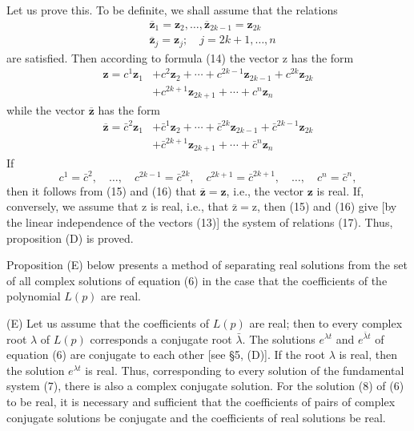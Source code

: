 \documentclass[10pt,a5paper]{book}
\theoremstyle{plain}
\theoremstyle{definition}
\theoremstyle{remark}
\begin{document}
Let us prove this. To be definite, we shall assume that the relations
\[
\begin{aligned}
& \overline{\mathbf{z}}_{1}=\mathbf{z}_{2}, \ldots, \overline{\mathbf{z}}_{2 k-1}=\mathbf{z}_{2 k} \\
& \overline{\mathbf{z}}_{j}=\mathbf{z}_{j} ; \quad j=2 k+1, \ldots, n
\end{aligned}
\]
are satisfied. Then according to formula (14) the vector z has the form
\begin{align*}
\mathbf{z}=c^{1} \mathbf{z}_{1} & +c^{2} \mathbf{z}_{2}+\cdots+c^{2 k-1} \mathbf{z}_{2 k-1}+c^{2 k} \mathbf{z}_{2 k} \\
& +c^{2 k+1} \mathbf{z}_{2 k+1}+\cdots+c^{n} \mathbf{z}_{n} \tag{15}
\end{align*}
while the vector $\overline{\mathbf{z}}$ has the form
\begin{align*}
\overline{\mathbf{z}}=\bar{c}^{2} \mathbf{z}_{1} & +\bar{c}^{1} \mathbf{z}_{2}+\cdots+\bar{c}^{2 k} \mathbf{z}_{2 k-1}+\bar{c}^{2 k-1} \mathbf{z}_{2 k} \\
& +\bar{c}^{2 k+1} \mathbf{z}_{2 k+1}+\cdots+\bar{c}^{n} \mathbf{z}_{n} \tag{16}
\end{align*}
If
\begin{equation*}
c^{1}=\bar{c}^{2}, \quad \ldots, \quad c^{2 k-1}=\bar{c}^{2 k}, \quad c^{2 k+1}=\bar{c}^{2 k+1}, \quad \ldots, \quad c^{n}=\bar{c}^{n}, \tag{17}
\end{equation*}
then it follows from (15) and (16) that $\overline{\mathbf{z}}=\mathbf{z}$, i.e., the vector $\mathbf{z}$ is real. If, conversely, we assume that z is real, i.e., that $\overline{\mathrm{z}}=\mathrm{z}$, then (15) and (16) give [by the linear independence of the vectors (13)] the system of relations (17). Thus, proposition (D) is proved.

Proposition (E) below presents a method of separating real solutions from the set of all complex solutions of equation (6) in the case that the coefficients of the polynomial $L(p)$ are real.

(E) Let us assume that the coefficients of $L(p)$ are real; then to every complex root $\lambda$ of $L(p)$ corresponds a conjugate root $\bar{\lambda}$. The solutions $e^{\lambda t}$ and $e^{\bar{\lambda} t}$ of equation (6) are conjugate to each other [see §5, (D)]. If the root $\lambda$ is real, then the solution $e^{\lambda t}$ is real. Thus, corresponding to every solution of the fundamental system (7), there is also a complex conjugate solution. For the solution (8) of (6) to be real, it is necessary and sufficient that the coefficients of pairs of complex conjugate solutions be conjugate and the coefficients of real solutions be real.
\end{document}
